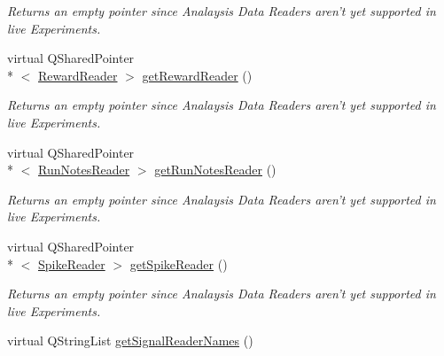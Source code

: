 \begin{DoxyCompactItemize}
\begin{DoxyCompactList}\small\item\em Returns an empty pointer since Analaysis Data Readers aren't yet supported in live Experiments. \end{DoxyCompactList}\item 
\hypertarget{class_picto_1_1_remote_state_updater_a43608821938dc7d5409684b10e7bda27}{virtual Q\-Shared\-Pointer\\*
$<$ \hyperlink{class_picto_1_1_reward_reader}{Reward\-Reader} $>$ \hyperlink{class_picto_1_1_remote_state_updater_a43608821938dc7d5409684b10e7bda27}{get\-Reward\-Reader} ()}\label{class_picto_1_1_remote_state_updater_a43608821938dc7d5409684b10e7bda27}

\begin{DoxyCompactList}\small\item\em Returns an empty pointer since Analaysis Data Readers aren't yet supported in live Experiments. \end{DoxyCompactList}\item 
\hypertarget{class_picto_1_1_remote_state_updater_a27d75b541f18710b27f69f6086697f19}{virtual Q\-Shared\-Pointer\\*
$<$ \hyperlink{class_picto_1_1_run_notes_reader}{Run\-Notes\-Reader} $>$ \hyperlink{class_picto_1_1_remote_state_updater_a27d75b541f18710b27f69f6086697f19}{get\-Run\-Notes\-Reader} ()}\label{class_picto_1_1_remote_state_updater_a27d75b541f18710b27f69f6086697f19}

\begin{DoxyCompactList}\small\item\em Returns an empty pointer since Analaysis Data Readers aren't yet supported in live Experiments. \end{DoxyCompactList}\item 
\hypertarget{class_picto_1_1_remote_state_updater_aa2c379599ddb36c8b79c54c34a69407f}{virtual Q\-Shared\-Pointer\\*
$<$ \hyperlink{class_picto_1_1_spike_reader}{Spike\-Reader} $>$ \hyperlink{class_picto_1_1_remote_state_updater_aa2c379599ddb36c8b79c54c34a69407f}{get\-Spike\-Reader} ()}\label{class_picto_1_1_remote_state_updater_aa2c379599ddb36c8b79c54c34a69407f}

\begin{DoxyCompactList}\small\item\em Returns an empty pointer since Analaysis Data Readers aren't yet supported in live Experiments. \end{DoxyCompactList}\item 
\hypertarget{class_picto_1_1_remote_state_updater_a0305ae6454a3a8bf5862385d6086510e}{virtual Q\-String\-List \hyperlink{class_picto_1_1_remote_state_updater_a0305ae6454a3a8bf5862385d6086510e}{get\-Signal\-Reader\-Names} ()}\label{class_picto_1_1_remote_state_updater_a0305ae6454a3a8bf5862385d6086510e}


\end{DoxyCompactItemize}
